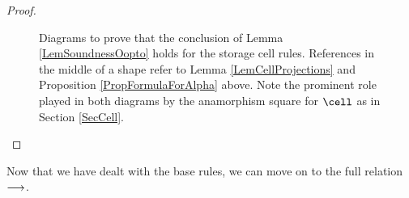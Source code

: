 \documentclass[11pt]{report}
\begin{document}
\begin{proof}
\begin{itemize}
\begin{figure}[htbp]
\begin{mathpar}
        \end{mathpar}
        \caption[Diagrams to prove that the conclusion of Lemma \ref{LemSoundnessOopto} holds for the storage cell rules.]{Diagrams to prove that the conclusion of Lemma \ref{LemSoundnessOopto} holds for the storage cell rules.  
        References in the middle of a shape refer to Lemma \ref{LemCellProjections} and Proposition \ref{PropFormulaForAlpha} above.  
        Note the prominent role played in both diagrams by the anamorphism square for $\cell$ as in Section \ref{SecCell}.}
        \label{FigSoundnessOoptoStorage}
      \end{figure}
  \end{itemize}
\end{proof}

Now that we have dealt with the base rules, we can move on to the full relation $\opto$.
\end{document}
